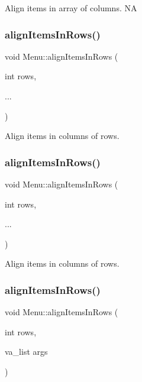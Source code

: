 Align items in array of columns.  NA \mbox{\label{classMenu_aef711df55d67e0b3606049df72041dec}} 
\subsubsection{\texorpdfstring{align\+Items\+In\+Rows()}{alignItemsInRows()}\hspace{0.1cm}{\footnotesize\ttfamily [1/4]}}
{\footnotesize\ttfamily void Menu\+::align\+Items\+In\+Rows (\begin{DoxyParamCaption}\item[{int}]{rows,  }\item[{}]{... }\end{DoxyParamCaption})}

Align items in columns of rows. \mbox{\label{classMenu_aef711df55d67e0b3606049df72041dec}} 
\subsubsection{\texorpdfstring{align\+Items\+In\+Rows()}{alignItemsInRows()}\hspace{0.1cm}{\footnotesize\ttfamily [2/4]}}
{\footnotesize\ttfamily void Menu\+::align\+Items\+In\+Rows (\begin{DoxyParamCaption}\item[{int}]{rows,  }\item[{}]{... }\end{DoxyParamCaption})}

Align items in columns of rows. \mbox{\label{classMenu_ac9e28ec85370f45fe4929cd393496a63}} 
\subsubsection{\texorpdfstring{align\+Items\+In\+Rows()}{alignItemsInRows()}\hspace{0.1cm}{\footnotesize\ttfamily [3/4]}}
{\footnotesize\ttfamily void Menu\+::align\+Items\+In\+Rows (\begin{DoxyParamCaption}\item[{int}]{rows,  }\item[{va\+\_\+list}]{args }\end{DoxyParamCaption})}

